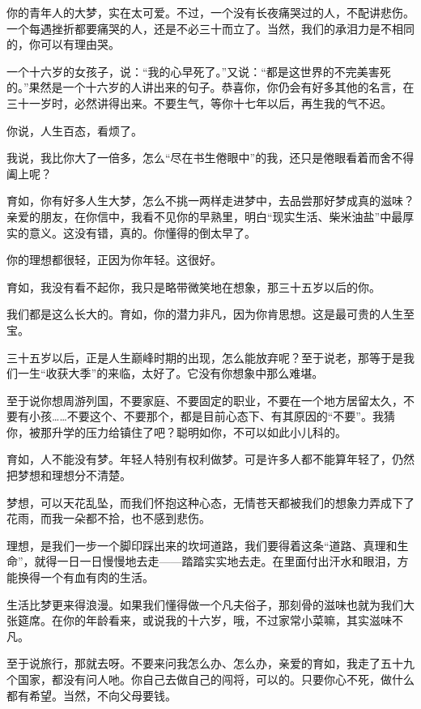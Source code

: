 \par {}
\par 你的青年人的大梦，实在太可爱。不过，一个没有长夜痛哭过的人，不配讲悲伤。一个每遇挫折都要痛哭的人，还是不必三十而立了。当然，我们的承泪力是不相同的，你可以有理由哭。
\par 一个十六岁的女孩子，说：“我的心早死了。”又说：“都是这世界的不完美害死的。”果然是一个十六岁的人讲出来的句子。恭喜你，你仍会有好多其他的名言，在三十一岁时，必然讲得出来。不要生气，等你十七年以后，再生我的气不迟。
\par 你说，人生百态，看烦了。
\par 我说，我比你大了一倍多，怎么“尽在书生倦眼中”的我，还只是倦眼看着而舍不得阖上呢？
\par 育如，你有好多人生大梦，怎么不挑一两样走进梦中，去品尝那好梦成真的滋味？亲爱的朋友，在你信中，我看不见你的早熟里，明白“现实生活、柴米油盐”中最厚实的意义。这没有错，真的。你懂得的倒太早了。
\par 你的理想都很轻，正因为你年轻。这很好。
\par 育如，我没有看不起你，我只是略带微笑地在想象，那三十五岁以后的你。
\par 我们都是这么长大的。育如，你的潜力非凡，因为你肯思想。这是最可贵的人生至宝。
\par 三十五岁以后，正是人生巅峰时期的出现，怎么能放弃呢？至于说老，那等于是我们一生“收获大季”的来临，太好了。它没有你想象中那么难堪。
\par 至于说你想周游列国，不要家庭、不要固定的职业，不要在一个地方居留太久，不要有小孩……不要这个、不要那个，都是目前心态下、有其原因的“不要”。我猜你，被那升学的压力给镇住了吧？聪明如你，不可以如此小儿科的。
\par 育如，人不能没有梦。年轻人特别有权利做梦。可是许多人都不能算年轻了，仍然把梦想和理想分不清楚。
\par 梦想，可以天花乱坠，而我们怀抱这种心态，无情苍天都被我们的想象力弄成下了花雨，而我一朵都不拾，也不感到悲伤。
\par 理想，是我们一步一个脚印踩出来的坎坷道路，我们要得着这条“道路、真理和生命”，就得一日一日慢慢地去走——踏踏实实地去走。在里面付出汗水和眼泪，方能换得一个有血有肉的生活。
\par 生活比梦更来得浪漫。如果我们懂得做一个凡夫俗子，那刻骨的滋味也就为我们大张筵席。在你的年龄看来，或说我的十六岁，哦，不过家常小菜嘛，其实滋味不凡。
\par 至于说旅行，那就去呀。不要来问我怎么办、怎么办，亲爱的育如，我走了五十九个国家，都没有问人吔。你自己去做自己的闯将，可以的。只要你心不死，做什么都有希望。当然，不向父母要钱。
\par {}


